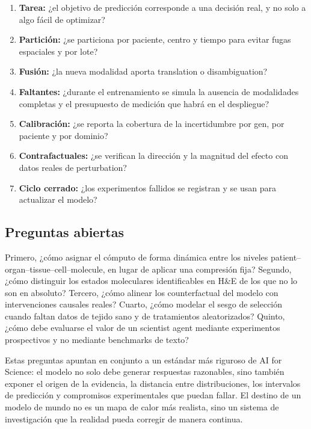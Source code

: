 \documentclass[a4paper]{article}
\begin{document}
\begin{enumerate}
  \item \textbf{Tarea:} ¿el objetivo de predicción corresponde a una decisión real, y no solo a algo fácil de optimizar?
  \item \textbf{Partición:} ¿se particiona por paciente, centro y tiempo para evitar fugas espaciales y por lote?
  \item \textbf{Fusión:} ¿la nueva modalidad aporta translation o disambiguation?
  \item \textbf{Faltantes:} ¿durante el entrenamiento se simula la ausencia de modalidades completas y el presupuesto de medición que habrá en el despliegue?
  \item \textbf{Calibración:} ¿se reporta la cobertura de la incertidumbre por gen, por paciente y por dominio?
  \item \textbf{Contrafactuales:} ¿se verifican la dirección y la magnitud del efecto con datos reales de perturbation?
  \item \textbf{Ciclo cerrado:} ¿los experimentos fallidos se registran y se usan para actualizar el modelo?
\end{enumerate}

\subsection{Preguntas abiertas}

Primero, ¿cómo asignar el cómputo de forma dinámica entre los niveles patient--organ--tissue--cell--molecule, en lugar de aplicar una compresión fija? Segundo, ¿cómo distinguir los estados moleculares identificables en H\&E de los que no lo son en absoluto? Tercero, ¿cómo alinear los counterfactual del modelo con intervenciones causales reales? Cuarto, ¿cómo modelar el sesgo de selección cuando faltan datos de tejido sano y de tratamientos aleatorizados? Quinto, ¿cómo debe evaluarse el valor de un scientist agent mediante experimentos prospectivos y no mediante benchmarks de texto?

Estas preguntas apuntan en conjunto a un estándar más riguroso de AI for Science: el modelo no solo debe generar respuestas razonables, sino también exponer el origen de la evidencia, la distancia entre distribuciones, los intervalos de predicción y compromisos experimentales que puedan fallar. El destino de un modelo de mundo no es un mapa de calor más realista, sino un sistema de investigación que la realidad pueda corregir de manera continua.
\end{document}
